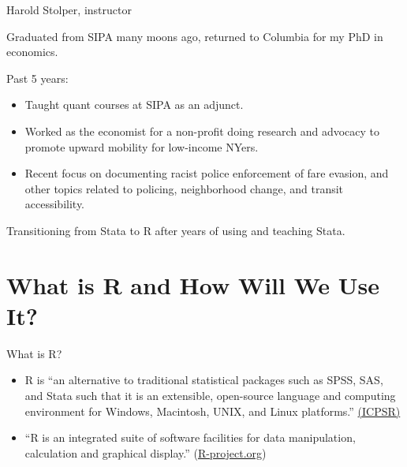 \documentclass[8pt,ignorenonframetext,dvipsnames]{beamer}
\providecommand{\tightlist}{%
  \setlength{\itemsep}{0pt}\setlength{\parskip}{0pt}}
\let\olditem\item
\renewcommand{\item}{%
  \olditem\vspace{4pt}
}
\begin{document}
\begin{frame}{Harold Stolper, instructor}
\protect\hypertarget{harold-stolper-instructor}{}

Graduated from SIPA many moons ago, returned to Columbia for my PhD in
economics.

\medskip

Past 5 years:

\begin{itemize}
\tightlist
\item
  Taught quant courses at SIPA as an adjunct.
\item
  Worked as the economist for a non-profit doing research and advocacy
  to promote upward mobility for low-income NYers.
\item
  Recent focus on documenting racist police enforcement of fare evasion,
  and other topics related to policing, neighborhood change, and transit
  accessibility.
\end{itemize}

\medskip

Transitioning from Stata to R after years of using and teaching Stata.

\end{frame}

\hypertarget{what-is-r-and-how-will-we-use-it}{%
\section{What is R and How Will We Use
It?}\label{what-is-r-and-how-will-we-use-it}}

\begin{frame}{What is R?}
\protect\hypertarget{what-is-r}{}

\begin{itemize}
\tightlist
\item
  R is ``an alternative to traditional statistical packages such as
  SPSS, SAS, and Stata such that it is an extensible, open-source
  language and computing environment for Windows, Macintosh, UNIX, and
  Linux platforms.''
  \href{https://www.icpsr.umich.edu/icpsrweb/content/shared/ICPSR/faqs/what-is-r.html}{(ICPSR)}
\end{itemize}

\medskip

\begin{itemize}
\tightlist
\item
  ``R is an integrated suite of software facilities for data
  manipulation, calculation and graphical display.''
  (\href{https://www.r-project.org/about.html}{R-project.org})
\end{itemize}

\end{frame}
\end{document}
